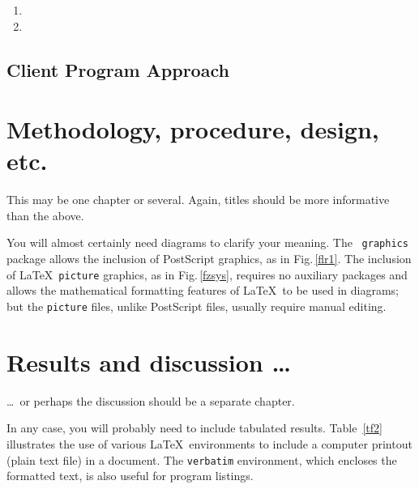 \documentclass[12pt,openany,a4paper]{book}
\newcommand{\fig}[1]  {Fig.\,\ref{#1}}		%
\newcommand{\tab}[1]  {Table~\ref{#1}}		%
\begin{document}
\begin{enumerate}
  \item 
  \item 
\end{enumerate}



\section{Client Program Approach}






\chapter{Methodology, procedure, design, etc.}

This may be one chapter or several.  Again, titles should be more
informative than the above.

You will almost certainly need diagrams to clarify your meaning.  The
\LaTeXe\ \texttt{graphics} package allows the inclusion of PostScript
graphics, as in \fig{flr1}.  The inclusion of \LaTeX\ \texttt{picture}
graphics, as in \fig{fzsys}, requires no auxiliary packages and allows
the mathematical formatting features of \LaTeX\ to be used in
diagrams; but the \texttt{picture} files, unlike PostScript files,
usually require manual editing.





\chapter{Results and discussion \ldots}

\ldots\ or perhaps the discussion should be a separate chapter.

In any case, you will probably need to include tabulated results.
\tab{tf2} illustrates the use of various \LaTeX\ environments to
include a computer printout (plain text file) in a document.  The
\texttt{verbatim} environment, which encloses the formatted text, is
also useful for program listings.
\end{document}
